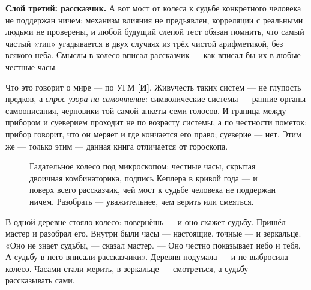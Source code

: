 \documentclass[11pt,letterpaper]{article}
\newcommand{\stI}{\textbf{[И]}\xspace}
\begin{document}
\textbf{Слой третий: рассказчик.} А вот мост от колеса к судьбе
конкретного человека не поддержан ничем: механизм влияния не
предъявлен, корреляции с реальными людьми не проверены, и любой
будущий слепой тест обязан помнить, что самый частый «тип» угадывается
в двух случаях из трёх чистой арифметикой, без всякого неба. Смыслы в
колесо вписал рассказчик --- как вписал бы их в любые честные часы.

Что это говорит о мире --- по УГМ \stI. Живучесть таких систем ---
не глупость предков, а \emph{спрос узора на самочтение}: символические
системы --- ранние органы самоописания, черновики той самой анкеты
семи голосов. И граница между прибором и суеверием проходит не по
возрасту системы, а по честности пометок: прибор говорит, что он
меряет и где кончается его право; суеверие --- нет. Этим же ---
только этим --- данная книга отличается от гороскопа.

\begin{figure}[H]
\centering
{}
\caption{Гадательное колесо под микроскопом: честные часы, скрытая
двоичная комбинаторика, подпись Кеплера в кривой года --- и поверх
всего рассказчик, чей мост к судьбе человека не поддержан ничем.
Разобрать --- уважительнее, чем верить или смеяться.}
\label{fig:wheel}
\end{figure}

\begin{skazbox}
В одной деревне стояло колесо: повернёшь --- и оно скажет судьбу.
Пришёл мастер и разобрал его. Внутри были часы --- настоящие, точные
--- и зеркальце. «Оно не знает судьбы, --- сказал мастер. --- Оно
честно показывает небо и тебя. А судьбу в него вписали рассказчики».
Деревня подумала --- и не выбросила колесо. Часами стали мерить,
в зеркальце --- смотреться, а судьбу --- рассказывать сами.
\end{skazbox}
\end{document}
